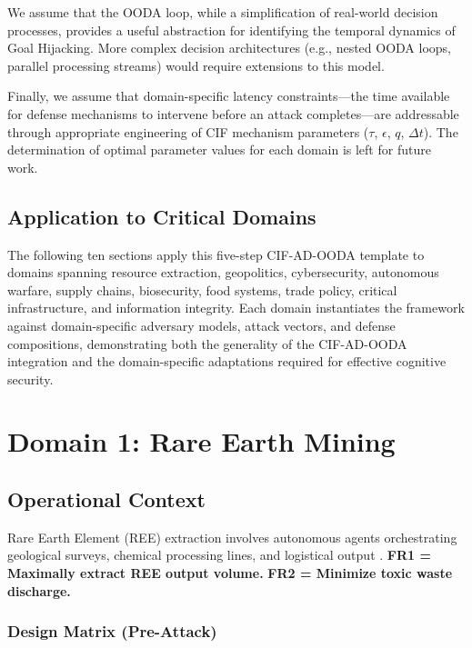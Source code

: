 \documentclass[
]{article}
\begin{document}
We assume that the OODA loop, while a simplification of real-world
decision processes, provides a useful abstraction for identifying the
temporal dynamics of Goal Hijacking. More complex decision architectures
(e.g., nested OODA loops, parallel processing streams) would require
extensions to this model.

Finally, we assume that domain-specific latency constraints---the time
available for defense mechanisms to intervene before an attack
completes---are addressable through appropriate engineering of CIF
mechanism parameters (\(\tau\), \(\epsilon\), \(q\), \(\Delta t\)). The
determination of optimal parameter values for each domain is left for
future work.

\subsection{Application to Critical
Domains}\label{application-to-critical-domains}

The following ten sections apply this five-step CIF-AD-OODA template to
domains spanning resource extraction, geopolitics, cybersecurity,
autonomous warfare, supply chains, biosecurity, food systems, trade
policy, critical infrastructure, and information integrity. Each domain
instantiates the framework against domain-specific adversary models,
attack vectors, and defense compositions, demonstrating both the
generality of the CIF-AD-OODA integration and the domain-specific
adaptations required for effective cognitive security.

\newpage

\section{Domain 1: Rare Earth Mining}\label{sec:domain_rare_earth}

\subsection{Operational Context}\label{operational-context}

Rare Earth Element (REE) extraction involves autonomous agents
orchestrating geological surveys, chemical processing lines, and
logistical output \cite{mancheri2019critical, balaram2019rare}.
\textbf{FR1 = Maximally extract REE output volume.} \textbf{FR2 =
Minimize toxic waste discharge.}

\subsubsection{Design Matrix
(Pre-Attack)}\label{design-matrix-pre-attack}
\end{document}
